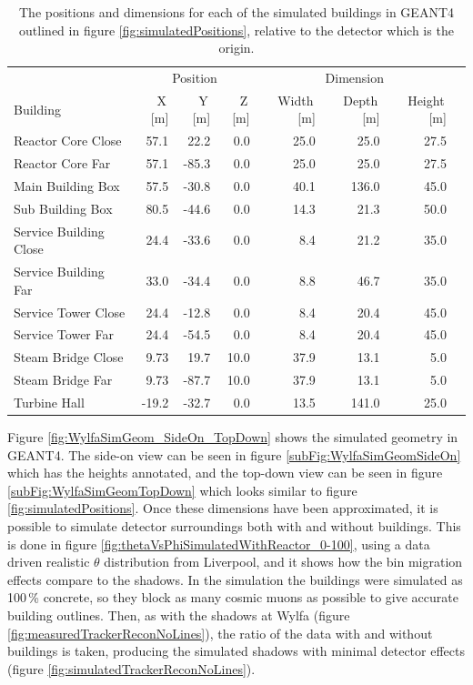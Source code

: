 \begin{table}[!h]
\centering
\begin{tabular}{lrrrrrrr}  
\toprule
\multicolumn{1}{c}{} & \multicolumn{3}{c}{Position} & \multicolumn{3}{c}{Dimension} \\
\cmidrule(r){2-4}
\cmidrule(r){5-7}
Building               & X\,[m] & Y\,[m] & Z\,[m] & Width\,[m] & Depth\,[m] & Height\,[m]\\
\midrule
Reactor Core Close     & 57.1   &  22.2  & 0.0     & 25.0       & 25.0       & 27.5\\
Reactor Core Far       & 57.1   & -85.3  & 0.0     & 25.0       & 25.0       & 27.5\\
Main Building Box      & 57.5   & -30.8  & 0.0     & 40.1       & 136.0      & 45.0\\
Sub Building Box       & 80.5   & -44.6  & 0.0     & 14.3       & 21.3       & 50.0\\
Service Building Close & 24.4   & -33.6  & 0.0     & 8.4        & 21.2       & 35.0\\
Service Building Far   & 33.0   & -34.4  & 0.0     & 8.8        & 46.7       & 35.0\\
Service Tower Close    & 24.4   & -12.8  & 0.0     & 8.4        & 20.4       & 45.0\\
Service Tower Far      & 24.4   & -54.5  & 0.0     & 8.4        & 20.4       & 45.0\\
Steam Bridge Close     & 9.73   &  19.7  & 10.0    & 37.9       & 13.1       & 5.0\\
Steam Bridge Far       & 9.73   & -87.7  & 10.0    & 37.9       & 13.1       & 5.0\\
Turbine Hall           & -19.2  & -32.7  & 0.0     & 13.5       & 141.0      & 25.0\\
\bottomrule  
\end{tabular}
\caption{The positions and dimensions for each of the simulated buildings in GEANT4 outlined in figure \ref{fig:simulatedPositions}, relative to the detector which is the origin.}
\label{tab:simulatedBuildingPositions}
\end{table}

Figure \ref{fig:WylfaSimGeom_SideOn_TopDown} shows the simulated geometry in  GEANT4. The side-on view can be seen in figure \ref{subFig:WylfaSimGeomSideOn} which has the heights annotated, and the top-down view can be seen in figure \ref{subFig:WylfaSimGeomTopDown} which looks similar to figure \ref{fig:simulatedPositions}. Once these dimensions have been approximated, it is possible to simulate detector surroundings both with and without buildings. This is done in figure \ref{fig:thetaVsPhiSimulatedWithReactor_0-100}, using a data driven realistic $\theta$ distribution from Liverpool, and it shows how the bin migration effects compare to the shadows. In the simulation the buildings were simulated as 100\,\% concrete, so they block as many cosmic muons as possible to give accurate building outlines. Then, as with the shadows at Wylfa (figure \ref{fig:measuredTrackerReconNoLines}), the ratio of the data with and without buildings is taken, producing the simulated shadows with minimal detector effects (figure \ref{fig:simulatedTrackerReconNoLines}). 

